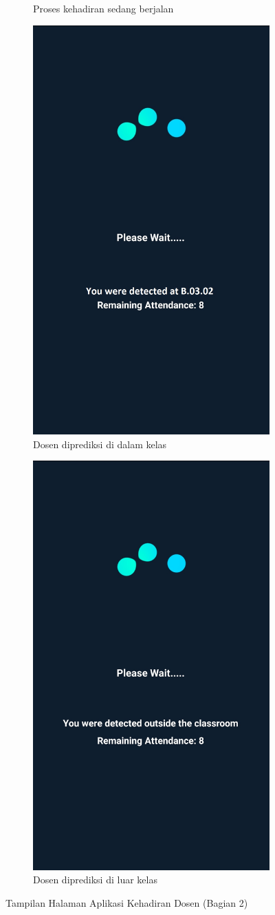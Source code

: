 \begin{enumerate}[a.]
\begin{figure} [H]
\begin{subfigure}{.5\textwidth}
  		\caption{Proses kehadiran sedang berjalan}
	\end{subfigure}
	\vspace{1cm}
	\newline
	\begin{subfigure}{.5\textwidth}
  		\centering
  		\includegraphics[width=.5\linewidth]{gambar/android/dosen-7}  
  		\caption{Dosen diprediksi di dalam kelas}
	\end{subfigure}
	\begin{subfigure}{.5\textwidth}
  		\centering
  		\includegraphics[width=.5\linewidth]{gambar/android/dosen-8}  
  		\caption{Dosen diprediksi di luar kelas}
	\end{subfigure}
		\vspace{0.5cm}
		\caption{Tampilan Halaman Aplikasi Kehadiran Dosen (Bagian 2)}
	\label{aplikasidosenbagian2}
	\end{figure}
	

\end{enumerate}
